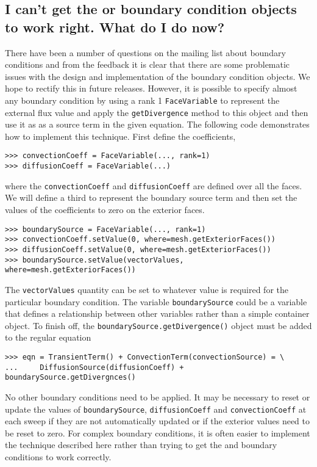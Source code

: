     \subsection{I can't get the  or  boundary
      condition objects to work right. What do I do now?\label{FAQ-anyBoundaryCondition}}

    There have been a number of questions on the mailing list about boundary
    conditions and from the feedback it is clear that there are some problematic
    issues with the design and implementation of the boundary condition objects.
    We hope to rectify this in future releases. However, it is possible to
    specify almost any boundary condition by using a rank 1 \verb+FaceVariable+
    to represent the external flux value and apply the \verb+getDivergence+
    method to this object and then use it as as a source term in the given
    equation. The following code demonstrates how to implement this technique.
    First define the coefficients,
\begin{verbatim}
>>> convectionCoeff = FaceVariable(..., rank=1)
>>> diffusionCoeff = FaceVariable(...)
\end{verbatim}
    where the \verb+convectionCoeff+ and \verb+diffusionCoeff+ are defined over
    all the faces. We will define a third  to represent the
    boundary source term and then set the values of the coefficients to zero on
    the exterior faces.
\begin{verbatim}
>>> boundarySource = FaceVariable(..., rank=1)
>>> convectionCoeff.setValue(0, where=mesh.getExteriorFaces())
>>> diffusionCoeff.setValue(0, where=mesh.getExteriorFaces())
>>> boundarySource.setValue(vectorValues, where=mesh.getExteriorFaces())
\end{verbatim}
    The \verb+vectorValues+ quantity can be set to whatever value is required for
    the particular boundary condition. The variable \verb+boundarySource+ could
    be a variable that defines a relationship between other variables rather than
    a simple container object. To finish off, the \verb+boundarySource.getDivergence()+ object
    must be added to the regular equation
\begin{verbatim}
>>> eqn = TransientTerm() + ConvectionTerm(convectionSource) = \
...     DiffusionSource(diffusionCoeff) + boundarySource.getDivergnces()
\end{verbatim}
    No other boundary conditions need to be applied. It may be necessary to reset
    or update the values of \verb+boundarySource+, \verb+diffusionCoeff+ and
    \verb+convectionCoeff+ at each sweep if they are not automatically updated or
    if the exterior values need to be reset to zero. For complex boundary
    conditions, it is often easier to implement the technique described here
    rather than trying to get the \Class{FixedValue} and \Class{FixedFlux}
    boundary conditions to work correctly.

